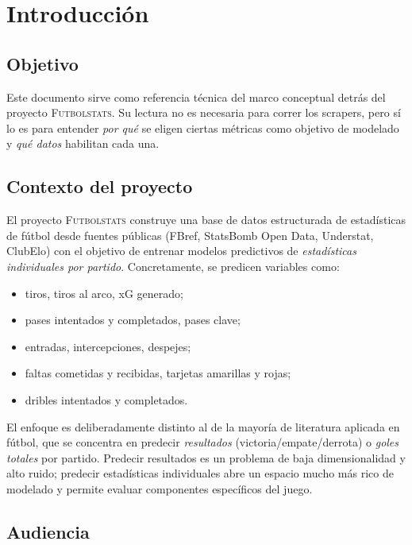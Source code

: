 \section{Introducción}
\label{sec:intro}

\subsection{Objetivo}

Este documento sirve como referencia técnica del marco conceptual detrás del proyecto \textsc{Futbolstats}. Su lectura no es necesaria para correr los scrapers, pero sí lo es para entender \emph{por qué} se eligen ciertas métricas como objetivo de modelado y \emph{qué datos} habilitan cada una.

\subsection{Contexto del proyecto}

El proyecto \textsc{Futbolstats} construye una base de datos estructurada de estadísticas de fútbol desde fuentes públicas (FBref, StatsBomb Open Data, Understat, ClubElo) con el objetivo de entrenar modelos predictivos de \emph{estadísticas individuales por partido}. Concretamente, se predicen variables como:

\begin{itemize}[noitemsep]
  \item tiros, tiros al arco, xG generado;
  \item pases intentados y completados, pases clave;
  \item entradas, intercepciones, despejes;
  \item faltas cometidas y recibidas, tarjetas amarillas y rojas;
  \item dribles intentados y completados.
\end{itemize}

\noindent
El enfoque es deliberadamente distinto al de la mayoría de literatura aplicada en fútbol, que se concentra en predecir \emph{resultados} (victoria/empate/derrota) o \emph{goles totales} por partido. Predecir resultados es un problema de baja dimensionalidad y alto ruido; predecir estadísticas individuales abre un espacio mucho más rico de modelado y permite evaluar componentes específicos del juego.

\subsection{Audiencia}

